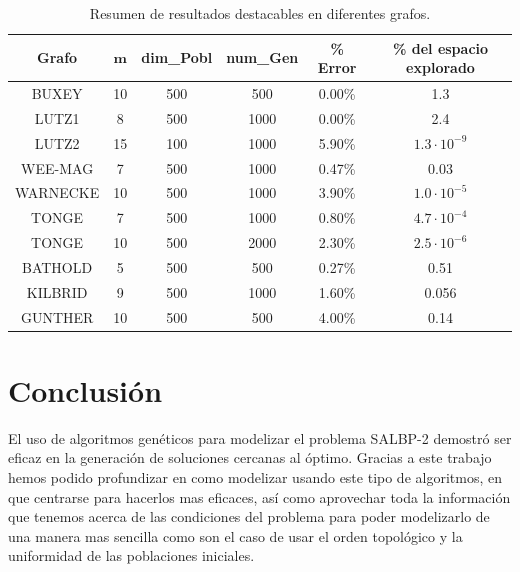 \documentclass[12pt,a4paper]{report}
\begin{document}
\begin{table}[H]
    \centering
    
    \label{tab:otros-resultados}
    \begin{tabular}{|c|c|c|c|c|c|}
        \hline
        \textbf{Grafo} & $\mathbf{m}$ & \textbf{dim\_Pobl} & \textbf{num\_Gen} & \textbf{\% Error} & \textbf{\% del espacio explorado} \\
        \hline
        BUXEY      & 10 & 500 & 500  & 0.00\%  & 1.3 \\
        LUTZ1      & 8  & 500 & 1000 & 0.00\%  & 2.4 \\
        LUTZ2      & 15 & 100 & 1000 & 5.90\%  & $1.3 \cdot 10^{-9}$ \\
        WEE-MAG    & 7  & 500 & 1000 & 0.47\%  & 0.03 \\
        WARNECKE   & 10 & 500 & 1000 & 3.90\%  & $1.0 \cdot 10^{-5}$ \\
        TONGE      & 7  & 500 & 1000 & 0.80\%  & $4.7 \cdot 10^{-4}$ \\
        TONGE      & 10 & 500 & 2000 & 2.30\%  & $2.5 \cdot 10^{-6}$ \\
        BATHOLD    & 5  & 500 & 500  & 0.27\%  & 0.51 \\
        KILBRID    & 9  & 500 & 1000 & 1.60\%  & 0.056 \\
        GUNTHER    & 10 & 500 & 500  & 4.00\%  & 0.14 \\
        \hline
    \end{tabular}
    \caption{Resumen de resultados destacables en diferentes grafos.}
\end{table}

\section{Conclusión}

El uso de algoritmos genéticos para modelizar el problema SALBP-2 demostró ser eficaz en la generación de soluciones cercanas al óptimo. Gracias a este trabajo hemos podido profundizar en como modelizar usando este tipo de algoritmos, en que centrarse para hacerlos mas eficaces, así como aprovechar toda la información que tenemos acerca de las condiciones del problema para poder modelizarlo de una manera mas sencilla como son el caso de usar el orden topológico y la uniformidad de las poblaciones iniciales.
\end{document}
